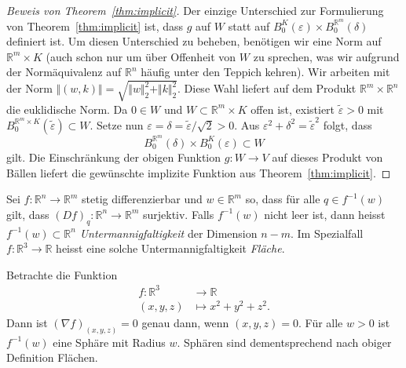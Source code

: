 \documentclass[../main.tex]{subfiles}
\begin{document}
\begin{proof}[Beweis von Theorem~\ref{thm:implicit}]
  Der einzige Unterschied zur Formulierung von Theorem~\ref{thm:implicit}
  ist, dass $g$ auf $W$ statt auf 
  $B_0^K(\varepsilon) \times B_0^{\mathbb{R}^m}(\delta)$ 
  definiert ist.
  Um diesen Unterschied zu beheben, benötigen wir eine Norm
  auf $\mathbb{R}^m \times K$ (auch schon nur um über Offenheit von $W$
  zu sprechen, was wir aufgrund der Normäquivalenz auf $\mathbb{R}^n$ 
  häufig unter den Teppich kehren). 
  Wir arbeiten mit der Norm $\Vert (w, k) \Vert =
  \sqrt{\Vert w \Vert_2^2 + \Vert k \Vert_2^2}$.
  Diese Wahl liefert auf dem Produkt
  $\mathbb{R}^m \times \mathbb{R}^n$ die euklidische Norm.
  Da $0 \in W$ und $W \subset \mathbb{R}^m \times K$ 
  offen ist, existiert $\widetilde \varepsilon > 0$ 
  mit $B_0^{\mathbb{R}^m \times K}(\widetilde \varepsilon) \subset W$.
  Setze nun $\varepsilon = \delta = \widetilde \varepsilon / \sqrt 2 > 0$.
  Aus $\varepsilon^2 + \delta^2 = \widetilde \varepsilon^2$ 
  folgt, dass
  \[
    B_0^{\mathbb{R}^m}(\delta) \times B_0^{K}(\varepsilon) \subset W
  \]
  gilt.
  Die Einschränkung der obigen Funktion $g \colon W \to V$ 
  auf dieses Produkt von Bällen liefert die gewünschte implizite
  Funktion aus Theorem~\ref{thm:implicit}.
\end{proof}

\begin{definition}
  Sei $f \colon \mathbb{R}^n \to \mathbb{R}^m$ stetig differenzierbar
  und $w \in \mathbb{R}^m$ 
  so, dass für alle $q \in f^{-1}(w)$ 
  gilt, dass ${(Df)}_q \colon \mathbb{R}^n \to \mathbb{R}^m$ 
  surjektiv.
  Falls $f^{-1}(w)$ nicht leer ist, 
  dann heisst $f^{-1}(w) \subset \mathbb{R}^n$ 
  \emph{Untermannigfaltigkeit} der Dimension $n - m$.
  Im Spezialfall $f \colon \mathbb{R}^3 \to \mathbb{R}$ 
  heisst eine solche Untermannigfaltigkeit \emph{Fläche}.
\end{definition}

\begin{example}
  Betrachte die Funktion
  \begin{align*}
    f \colon \mathbb{R}^3 & \to \mathbb{R} \\
    (x, y, z) & \mapsto x^2 + y^2 + z^2.
  \end{align*}
  Dann ist ${(\nabla f)}_{(x, y, z)} = 0$
  genau dann, wenn $(x, y, z) = 0$.
  Für alle $w > 0$ ist $f^{-1}(w)$ eine Sphäre mit Radius $w$.
  Sphären sind dementsprechend nach obiger Definition Flächen.
\end{example}
\end{document}
